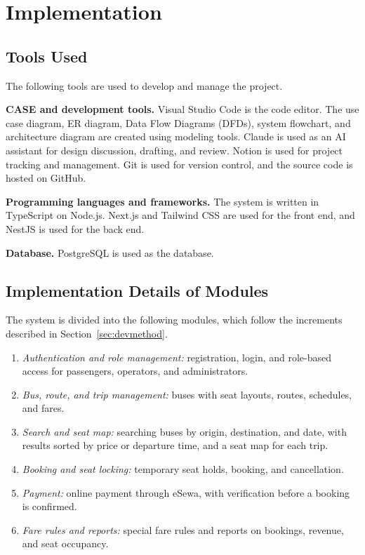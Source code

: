 
\section{Implementation}

\subsection{Tools Used}

The following tools are used to develop and manage the project.

\textbf{CASE and development tools.} Visual Studio Code is the code editor. The use case diagram, ER diagram, Data Flow Diagrams (DFDs), system flowchart, and architecture diagram are created using modeling tools. Claude is used as an AI assistant for design discussion, drafting, and review. Notion is used for project tracking and management. Git is used for version control, and the source code is hosted on GitHub.

\textbf{Programming languages and frameworks.} The system is written in TypeScript on Node.js. Next.js and Tailwind CSS are used for the front end, and NestJS is used for the back end.

\textbf{Database.} PostgreSQL is used as the database.

\subsection{Implementation Details of Modules}

The system is divided into the following modules, which follow the increments described in Section~\ref{sec:devmethod}.
\begin{enumerate}
  \item \textit{Authentication and role management:} registration, login, and role-based access for passengers, operators, and administrators.
  \item \textit{Bus, route, and trip management:} buses with seat layouts, routes, schedules, and fares.
  \item \textit{Search and seat map:} searching buses by origin, destination, and date, with results sorted by price or departure time, and a seat map for each trip.
  \item \textit{Booking and seat locking:} temporary seat holds, booking, and cancellation.
  \item \textit{Payment:} online payment through eSewa, with verification before a booking is confirmed.
  \item \textit{Fare rules and reports:} special fare rules and reports on bookings, revenue, and seat occupancy.
\end{enumerate}


